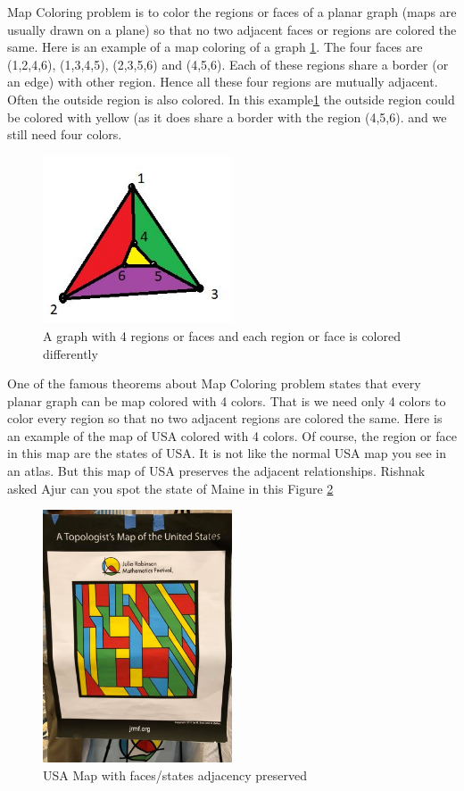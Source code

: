 Map Coloring problem is to color the regions or faces of a planar graph (maps are usually drawn on a plane) so that no two adjacent faces or regions are colored the same. Here is an example of a map coloring
of a graph \ref{10g8}. The four faces are (1,2,4,6), (1,3,4,5), (2,3,5,6) and (4,5,6). Each of these regions share a border (or an edge) with other region. Hence all these four regions are mutually adjacent. Often the outside region is also colored. In this example\ref{10g8} the outside region could be colored with yellow (as it does share a border with the region (4,5,6). and we still need four colors.
\begin{figure}
\begin{center}
\includegraphics[width=0.5\textwidth]{mapcolor.JPG}
\end{center}
\caption{A graph with 4 regions or faces and each region or face is colored differently}\label{10g8}
\end{figure}

One of the famous theorems about Map Coloring problem states that every planar graph can be map colored with 4 colors. That is we need only 4 colors to color every region so that no two adjacent regions are colored the same. Here is an example of the map of USA colored with 4 colors. Of course, the region or face in this map are the states of USA. It is not like the normal USA map you see in an atlas. But this map of USA preserves the adjacent relationships. Rishnak asked Ajur can you spot the state of Maine in this Figure \ref{10g9}
\begin{figure}
\begin{center}
\includegraphics[width=0.5\textwidth]{usamap.png}
\end{center}
\caption{USA Map with faces/states adjacency preserved}\label{10g9}
\end{figure}

